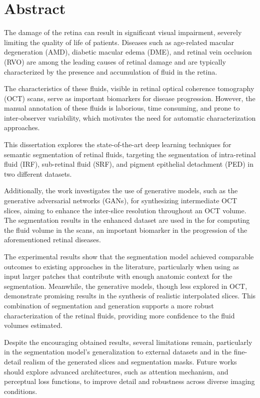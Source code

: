\chapter*{Abstract}
The damage of the retina can result in significant visual impairment, severely limiting the quality of life of patients. Diseases such as age-related macular degeneration (AMD), diabetic macular edema (DME), and retinal vein occlusion (RVO) are among the leading causes of retinal damage and are typically characterized by the presence and accumulation of fluid in the retina. 
\par
The characteristics of these fluids, visible in retinal optical coherence tomography (OCT) scans, serve as important biomarkers for disease progression. However, the manual annotation of these fluids is laborious, time consuming, and prone to inter-observer variability, which motivates the need for automatic characterization approaches.
\par
This dissertation explores the state-of-the-art deep learning techniques for semantic segmentation of retinal fluids, targeting the segmentation of intra-retinal fluid (IRF), sub-retinal fluid (SRF), and pigment epithelial detachment (PED) in two different datasets. 
\par
Additionally, the work investigates the use of generative models, such as the generative adversarial networks (GANs), for synthesizing intermediate OCT slices, aiming to enhance the inter-slice resolution throughout an OCT volume. The segmentation results in the enhanced dataset are used in the for computing the fluid volume in the scans, an important biomarker in the progression of the aforementioned retinal diseases.
\par
The experimental results show that the segmentation model achieved comparable outcomes to existing approaches in the literature, particularly when using as input larger patches that contribute with enough anatomic context for the segmentation. Meanwhile, the generative models, though less explored in OCT, demonstrate promising results in the synthesis of realistic interpolated slices. This combination of segmentation and generation supports a more robust characterization of the retinal fluids, providing more confidence to the fluid volumes estimated.
\par
Despite the encouraging obtained results, several limitations remain, particularly in the segmentation model's generalization to external datasets and in the fine-detail realism of the generated slices and segmentation masks. Future works should explore advanced architectures, such as attention mechanism, and perceptual loss functions, to improve detail and robustness across diverse imaging conditions.